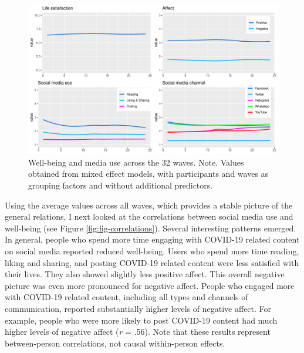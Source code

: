 \documentclass[
  man,mask,floatsintext]{apa7}
\begin{document}
\begin{figure}
\includegraphics[width=\textwidth]{figures/fig_descriptives} \caption{Well-being and media use across the 32 waves. Note. Values obtained from mixed effect models, with participants and waves as grouping factors and without additional predictors.}\label{fig:fig-descriptives}
\end{figure}

Using the average values across all waves, which provides a stable picture of the general relations, I next looked at the correlations between social media use and well-being (see Figure \ref{fig:fig-correlations}).
Several interesting patterns emerged.
In general, people who spend more time engaging with COVID-19 related content on social media reported reduced well-being.
Users who spend more time reading, liking and sharing, and posting COVID-19 related content were less satisfied with their lives.
They also showed slightly less positive affect.
This overall negative picture was even more pronounced for negative affect.
People who engaged more with COVID-19 related content, including all types and channels of communication, reported substantially higher levels of negative affect.
For example, people who were more likely to post COVID-19 content had much higher levels of negative affect (\emph{r} = .56).
Note that these results represent between-person correlations, not causal within-person effects.
\end{document}
